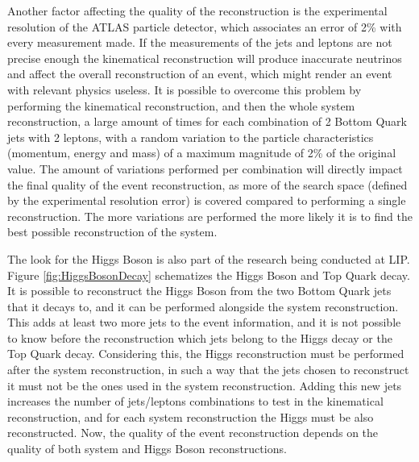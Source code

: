 Another factor affecting the quality of the reconstruction is the experimental resolution of the ATLAS particle detector, which associates an error of 2\% with every measurement made. If the measurements of the jets and leptons are not precise enough the kinematical reconstruction will produce inaccurate neutrinos and affect the overall reconstruction of an event, which might render an event with relevant physics useless. It is possible to overcome this problem by performing the kinematical reconstruction, and then the whole \ttbar system reconstruction, a large amount of times for each combination of 2 Bottom Quark jets with 2 leptons, with a random variation to the particle characteristics (momentum, energy and mass) of a maximum magnitude of 2\% of the original value. The amount of variations performed per combination will directly impact the final quality of the event reconstruction, as more of the search space (defined by the experimental resolution error) is covered compared to performing a single reconstruction. The more variations are performed the more likely it is to find the best possible reconstruction of the \ttbar system.

The look for the Higgs Boson is also part of the research being conducted at LIP. Figure \ref{fig:HiggsBosonDecay} schematizes the Higgs Boson and Top Quark decay. It is possible to reconstruct the Higgs Boson from the two Bottom Quark jets that it decays to, and it can be performed alongside the \ttbar system reconstruction. This adds at least two more jets to the event information, and it is not possible to know before the reconstruction which jets belong to the Higgs decay or the Top Quark decay. Considering this, the Higgs reconstruction must be performed after the \ttbar system reconstruction, in such a way that the jets chosen to reconstruct it must not be the ones used in the \ttbar system reconstruction. Adding this new jets increases the number of jets/leptons combinations to test in the kinematical reconstruction, and for each \ttbar system reconstruction the Higgs must be also reconstructed. Now, the quality of the event reconstruction depends on the quality of both \ttbar system and Higgs Boson reconstructions.

